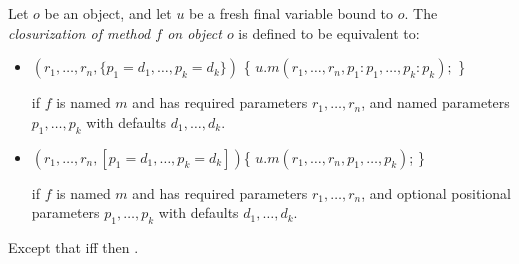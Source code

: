 \documentclass{article}
\begin{document}
\LMHash{}
Let $o$ be an object, and let $u$ be a fresh final variable bound to $o$.
The {\em closurization of method $f$ on object $o$} is defined to be equivalent to:
\begin{itemize}
\item
\begin{dartCode}
$(r_1, \ldots, r_n, \{p_1 = d_1, \ldots , p_k = d_k\})$ \{
  \RETURN{} $ u.m(r_1, \ldots, r_n, p_1: p_1, \ldots, p_k: p_k);$
\}
\end{dartCode}
if $f$ is named $m$ and has required parameters $r_1, \ldots, r_n$, and named parameters $p_1, \ldots, p_k$ with defaults $d_1, \ldots, d_k$.
\item
\begin{dartCode}
$(r_1, \ldots, r_n, [p_1 = d_1, \ldots , p_k = d_k])$\{
  \RETURN{} $u.m(r_1, \ldots, r_n, p_1, \ldots, p_k)$;
\}
\end{dartCode}
if $f$ is named $m$ and has required parameters $r_1, \ldots, r_n$, and optional positional parameters $p_1, \ldots, p_k$ with defaults $d_1, \ldots, d_k$.
\end{itemize}

\LMHash{}
Except that if{}f  then .


\end{document}
